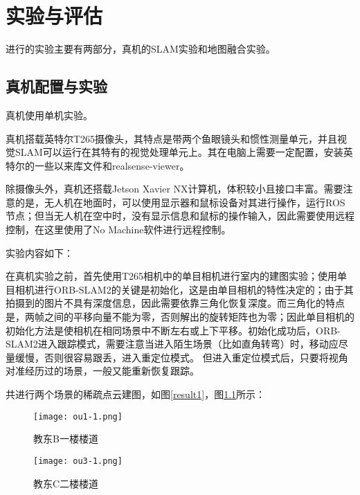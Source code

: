 \renewcommand{\baselinestretch}{1.5}
\fontsize{12pt}{13pt}\selectfont

\chapter{实验与评估} \label{experiment}

进行的实验主要有两部分，真机的SLAM实验和地图融合实验。

\section{真机配置与实验}

真机使用单机实验。

真机搭载英特尔T265摄像头，其特点是带两个鱼眼镜头和惯性测量单元，并且视觉SLAM可以运行在其特有的视觉处理单元上。其在电脑上需要一定配置，安装英特尔的一些以来库文件和realsense-viewer。

除摄像头外，真机还搭载Jetson Xavier NX计算机，体积较小且接口丰富。需要注意的是，无人机在地面时，可以使用显示器和鼠标设备对其进行操作，运行ROS节点；但当无人机在空中时，没有显示信息和鼠标的操作输入，因此需要使用远程控制，在这里使用了No Machine软件进行远程控制。

实验内容如下：

在真机实验之前，首先使用T265相机中的单目相机进行室内的建图实验；使用单目相机进行ORB-SLAM2的关键是初始化，这是由单目相机的特性决定的；由于其拍摄到的图片不具有深度信息，因此需要依靠三角化恢复深度。而三角化的特点是，两帧之间的平移向量不能为零，否则解出的旋转矩阵也为零；因此单目相机的初始化方法是使相机在相同场景中不断左右或上下平移。初始化成功后，ORB-SLAM2进入跟踪模式，需要注意当进入陌生场景（比如直角转弯）时，移动应尽量缓慢，否则很容易跟丢，进入重定位模式。
但进入重定位模式后，只要将视角对准经历过的场景，一般又能重新恢复跟踪。

共进行两个场景的稀疏点云建图，如图\ref{result1}，图\ref{result2}所示：

\begin{figure}[htbp]
	\centering
	\begin{minipage}[t]{0.45\columnwidth} %
		\centering
		\texttt{[image: ou1-1.png]}
		\caption{教东B一楼楼道}
		\label{result1}
	\end{minipage}
	\begin{minipage}[t]{0.45\columnwidth}
		\centering
		\texttt{[image: ou3-1.png]}
		\caption{教东C二楼楼道}
		\label{result2}
	\end{minipage}
\end{figure}


